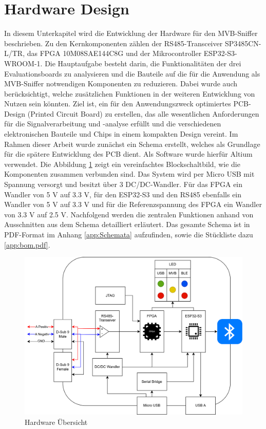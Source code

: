 
\section{Hardware Design}
\label{sec:Hardware Design}

In diesem Unterkapitel wird die Entwicklung der Hardware für den MVB-Sniffer beschrieben. Zu den Kernkomponenten zählen der RS485-Transceiver SP3485CN-L/TR, das FPGA 10M08SAE144C8G und der Mikrocontroller ESP32-S3-WROOM-1. Die Hauptaufgabe besteht darin, die Funktionalitäten der drei Evaluationsboards zu analysieren und die Bauteile auf die für die Anwendung als MVB-Sniffer notwendigen Komponenten zu reduzieren. Dabei wurde auch berücksichtigt, welche zusätzlichen Funktionen in der weiteren Entwicklung von Nutzen sein könnten. Ziel ist, ein für den Anwendungszweck optimiertes PCB-Design (Printed Circuit Board) zu erstellen, das alle wesentlichen Anforderungen für die Signalverarbeitung und -analyse erfüllt und die verschiedenen elektronischen Bauteile und Chips in einem kompakten Design vereint. Im Rahmen dieser Arbeit wurde zunächst ein Schema erstellt, welches als Grundlage für die spätere Entwicklung des PCB dient. Als Software wurde hierfür Altium verwendet. Die Abbildung \ref{fig:Hardware Übersicht} zeigt ein vereinfachtes Blockschaltbild, wie die Komponenten zusammen verbunden sind. Das System wird per Micro USB mit Spannung versorgt und besitzt über 3 DC/DC-Wandler. Für das FPGA  ein Wandler von 5 V auf 3.3 V, für den ESP32-S3 und den RS485 ebenfalls ein Wandler von 5 V auf 3.3 V und für die Referenzspannung des FPGA ein Wandler von 3.3 V auf 2.5 V. Nachfolgend werden die zentralen Funktionen anhand von Ausschnitten aus dem Schema detailliert erläutert. Das gesamte Schema ist in PDF-Format im Anhang \ref{app:Schemata} aufzufinden, sowie die Stückliste dazu \ref{app:bom.pdf}.

\begin{figure}[H]
    \centering
    \includegraphics[width=0.8\linewidth]{Figures/Chap3/Schematics/Aufbau_Hardware_Sniffer.drawio.png}
    \caption{Hardware Übersicht}
    \label{fig:Hardware Übersicht}
\end{figure}



